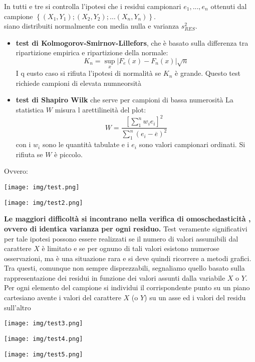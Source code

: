 \documentclass[a4paper,12pt, oneside]{book}
\begin{document}
In tutti e tre si controlla l'ipotesi che i residui campionari $e_1,...,e_n$ ottenuti dal campione
$\left\{\left(X_{1}, Y_{1}\right) ;\left(X_{2}, Y_{2}\right) ; \ldots\left(X_{n}, Y_{n}\right)\right\}$.\\
siano distribuiti normalmente con media nulla e varianza $s_{RES}^2$.
\begin{itemize}
\item \textbf{test di Kolmogorov-Smirnov-Lillefors}, che è basato sulla differenza tra ripartizione empirica e ripartizione della normale:
  \[K_{n}=\sup_{x}\left|F_{e}(x)-F_{n}(x)\right| \sqrt{n}\]
  I q eusto caso si rifiuta l'ipotesi di normalità se $K_n$ è grande. Questo test richiede campioni di elevata numneorsità
\item \textbf{test di Shapiro Wilk} che serve per campioni di bassa numerosità La statistica $W$ misura l arettilineità del plot:
  \[W=\frac{\left[\sum_{1}^{n} w_{i} e_{i}\right]^{2}}{\sum_{1}^{n}\left(e_{i}-\overline{e}\right)^{2}}\]
  con i $w_i$ sono le quantità tabulate e i $e_i$ sono valori campionari ordinati. Si rifiuta se $W$ è piccolo.
\end{itemize}
\newpage
Ovvero:
\begin{center}
\texttt{[image: img/test.png]}
\end{center}
\begin{center}
\texttt{[image: img/test2.png]}
\end{center}
\textbf{Le maggiori difficoltà si incontrano nella verifica di omoschedasticità , ovvero di
identica varianza per ogni residuo.} Test veramente significativi per tale ipotesi possono essere realizzati se il numero di
valori assumibili dal carattere $X$ è limitato e se per ognuno di tali valori esistono
numerose osservazioni, ma è una situazione rara e si deve quindi ricorrere a metodi grafici.\\
Tra questi, comunque non sempre disprezzabili, segnaliamo quello basato sulla
rappresentazione dei residui in funzione dei valori assunti dalla variabile $X$ o $Y$.
Per ogni elemento del campione si individui il corrispondente punto su un piano
cartesiano avente i valori del carattere $X$ (o $Y$) su un asse ed i valori del residu
sull’altro
\begin{center}
\texttt{[image: img/test3.png]}
\end{center}
\begin{center}
\texttt{[image: img/test4.png]}
\end{center}
\begin{center}
\texttt{[image: img/test5.png]}
\end{center}
\end{document}
